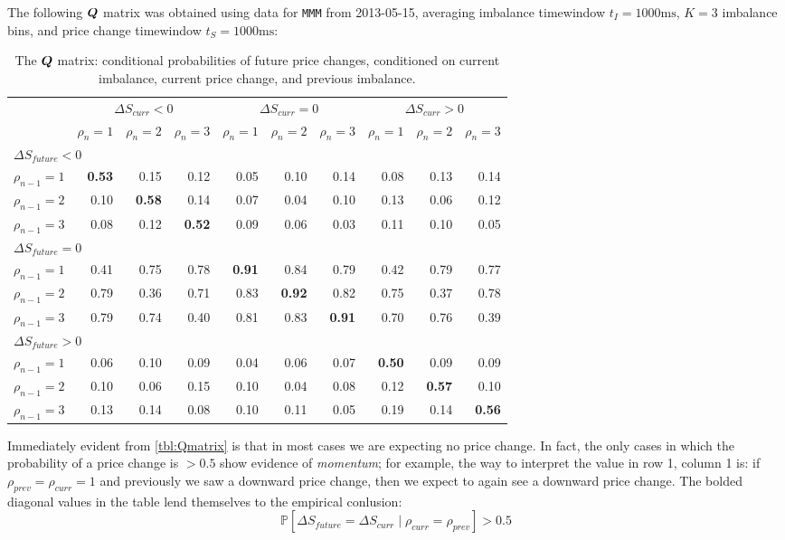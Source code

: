 The following $\boldsymbol{Q}$ matrix was obtained using data for \texttt{MMM} from 2013-05-15, averaging imbalance timewindow $t_I = 1000\text{ms}$, $K=3$ imbalance bins, and price change timewindow $t_S = 1000\text{ms}$:
\begin{table}[H]
\centering
{}
\begin{tabular}{@{} *{10}{r} @{}}
\toprule
& \multicolumn{3}{c}{$\Delta S_{curr} < 0$} & \multicolumn{3}{c}{$\Delta S_{curr} = 0$} & \multicolumn{3}{c}{$\Delta S_{curr} > 0$} \\
\cmidrule(lr){2-4} \cmidrule(lr){5-7} \cmidrule(lr){8-10}
&  $\rho_{n} = 1$ & $\rho_{n} = 2$ & $\rho_{n} = 3$ & $\rho_{n} = 1$ & $\rho_{n} = 2$ & $\rho_{n} = 3$ & $\rho_{n} = 1$ & $\rho_{n} = 2$ & $\rho_{n} = 3$ \\
\midrule
\multicolumn{10}{l}{$\Delta S_{future} < 0$} \\
$\rho_{n-1} = 1$ & \bf 0.53 & 0.15 & 0.12 & 0.05 & 0.10 & 0.14 & 0.08 & 0.13 & 0.14 \\
$\rho_{n-1} = 2$ & 0.10 & \bf 0.58 & 0.14 & 0.07 & 0.04 & 0.10 & 0.13 & 0.06 & 0.12 \\
$\rho_{n-1} = 3$ & 0.08 & 0.12 & \bf 0.52 & 0.09 & 0.06 & 0.03 & 0.11 & 0.10 & 0.05 \\[0.6ex]
\multicolumn{10}{l}{$\Delta S_{future} = 0$} \\
$\rho_{n-1} = 1$ & 0.41 & 0.75 & 0.78 & \bf 0.91 & 0.84 & 0.79 & 0.42 & 0.79 & 0.77 \\
$\rho_{n-1} = 2$ & 0.79 & 0.36 & 0.71 & 0.83 & \bf 0.92 & 0.82 & 0.75 & 0.37 & 0.78 \\
$\rho_{n-1} = 3$ & 0.79 & 0.74 & 0.40 & 0.81 & 0.83 & \bf 0.91 & 0.70 & 0.76 & 0.39 \\[0.6ex]
\multicolumn{10}{l}{$\Delta S_{future} > 0$} \\
$\rho_{n-1} = 1$ & 0.06 & 0.10 & 0.09 & 0.04 & 0.06 & 0.07 & \bf 0.50 & 0.09 & 0.09 \\
$\rho_{n-1} = 2$ & 0.10 & 0.06 & 0.15 & 0.10 & 0.04 & 0.08 & 0.12 & \bf 0.57 & 0.10 \\
$\rho_{n-1} = 3$ & 0.13 & 0.14 & 0.08 & 0.10 & 0.11 & 0.05 & 0.19 & 0.14 & \bf 0.56 \\
\bottomrule
\end{tabular}
\caption{The $\boldsymbol{Q}$ matrix: conditional probabilities of future price changes, conditioned on current imbalance, current price change, and previous imbalance.}
\label{tbl:Qmatrix}
\end{table}

Immediately evident from \autoref{tbl:Qmatrix} is that in most cases we are expecting no price change. In fact, the only cases in which the probability of a price change is $>0.5$ show evidence of \textit{momentum}; for example, the way to interpret the value in row 1, column 1 is: if $\rho_{prev} = \rho_{curr} = 1$ and previously we saw a downward price change, then we expect to again see a downward price change. The bolded diagonal values in the table lend themselves to the empirical conlusion:
\begin{equation}\label{eq:EDAKeyInsight}
\mathbb{P} \left[ \Delta S_{future} = \Delta S_{curr} \; | \; \rho_{curr} = \rho_{prev} \right] > 0.5
\end{equation}

